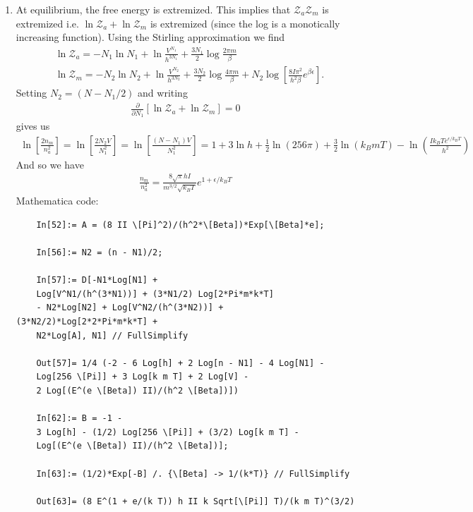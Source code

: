 \documentclass{article}
\theoremstyle{definition}
\newcommand{\p}{\partial}
\newcommand{\be}{\beta}
\newcommand{\f}[2]{\frac{#1}{#2}}
\newcommand{\lp}{\left(}
\newcommand{\rp}{\right)}
\newcommand{\lb}{\left[}
\newcommand{\rb}{\right]}
\begin{document}
\begin{enumerate}[label=(\alph*)]
	\item At equilibrium, the free energy is extremized. This implies that $\mathcal{Z}_a\mathcal{Z}_m$ is extremized i.e. $\ln \mathcal{Z}_a + \ln \mathcal{Z}_m$ is extremized (since the log is a monotically increasing function). Using the Stirling approximation we find 
	\begin{align*}
	&\ln \mathcal{Z}_a  = -N_1 \ln N_1 + \ln \f{V^{N_1}}{h^{3N_1}} + \f{3N_1}{2}\log \f{2\pi m }{\be}\\
	&\ln \mathcal{Z}_m  = -N_2\ln N_2  + \ln \f{V^{N_2}}{h^{3N_2}} + \f{3N_2}{2}\log \f{4\pi m }{\be} + N_2\log \lb \f{8I\pi^2}{h^2\be} e^{\be\epsilon} \rb.
	\end{align*}
	Setting $N_2 = (N-N_1/2)$ and writing
	\begin{align*}
	\f{\p}{\p N_1}\lb  \ln \mathcal{Z}_a + \ln \mathcal{Z}_m \rb = 0
	\end{align*}
	gives us 
	\begin{align*}
	\ln \lb \f{2n_m}{n_a^2} \rb = \ln \lb \f{2N_2 V}{N_1^2} \rb = \ln \lb \f{(N-N_1)V}{N_1^2} \rb = 1 + 3\ln h + \f{1}{2}\ln (256\pi) + \f{3}{2}\ln (k_B m T) - \ln \lp \f{I k_BT e^{\epsilon/k_BT}}{h^2} \rp
	\end{align*}
	And so we have
	\begin{align*}
	\boxed{\f{n_m}{n_a^2} = \f{8\sqrt{\pi} hI  }{m^{3/2} \sqrt{k_BT}} e^{1+\epsilon/k_BT}}
	\end{align*}
	Mathematica code:
	\begin{lstlisting}
	In[52]:= A = (8 II \[Pi]^2)/(h^2*\[Beta])*Exp[\[Beta]*e];
	
	In[56]:= N2 = (n - N1)/2;
	
	In[57]:= D[-N1*Log[N1] + 
	Log[V^N1/(h^(3*N1))] + (3*N1/2) Log[2*Pi*m*k*T]
	- N2*Log[N2] + Log[V^N2/(h^(3*N2))] + (3*N2/2)*Log[2*2*Pi*m*k*T] + 
	N2*Log[A], N1] // FullSimplify
	
	Out[57]= 1/4 (-2 - 6 Log[h] + 2 Log[n - N1] - 4 Log[N1] - 
	Log[256 \[Pi]] + 3 Log[k m T] + 2 Log[V] - 
	2 Log[(E^(e \[Beta]) II)/(h^2 \[Beta])])
	
	In[62]:= B = -1 - 
	3 Log[h] - (1/2) Log[256 \[Pi]] + (3/2) Log[k m T] - 
	Log[(E^(e \[Beta]) II)/(h^2 \[Beta])];
	
	In[63]:= (1/2)*Exp[-B] /. {\[Beta] -> 1/(k*T)} // FullSimplify
	
	Out[63]= (8 E^(1 + e/(k T)) h II k Sqrt[\[Pi]] T)/(k m T)^(3/2)
	\end{lstlisting}
\end{enumerate}
\end{document}
